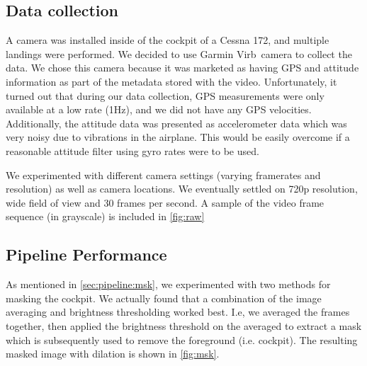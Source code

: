 \documentclass[letterpaper, conference]{IEEEtran}  %
\begin{document}
\subsection{Data collection}
A camera was installed inside of the cockpit of a Cessna 172, and multiple landings were performed. We decided to use Garmin Virb\texttrademark  \ camera to collect the data. We chose this camera because it was marketed as having GPS and attitude information as part of the metadata stored with the video. Unfortunately, it turned out that during our data collection, GPS measurements were only available at a low rate (1Hz), and we did not have any GPS velocities. Additionally, the attitude data was presented as accelerometer data which was very noisy due to vibrations in the airplane. This would be easily overcome if a reasonable attitude filter using gyro rates were to be used.

We experimented with different camera settings (varying framerates and resolution) as well as camera locations. We eventually settled on 720p resolution, wide field of view and 30 frames per second. A sample of the video frame sequence (in grayscale) is included in \cref{fig:raw}

\subsection{Pipeline Performance}
As mentioned in \cref{sec:pipeline:msk}, we experimented with two methods for masking the cockpit. We actually found that a combination of the image averaging and brightness thresholding worked best. I.e, we averaged the frames together, then applied the brightness threshold on the averaged to extract a mask which is subsequently used to remove the foreground (i.e. cockpit). The resulting masked image with dilation is shown in \cref{fig:msk}.
\end{document}
